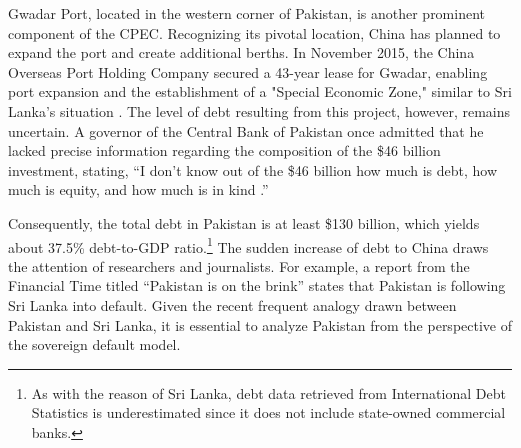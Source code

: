 Gwadar Port, located in the western corner of Pakistan, is another prominent component of the CPEC.
Recognizing its pivotal location, China has planned to expand the port and create additional berths. In November 2015, the China Overseas Port Holding Company secured a 43-year lease for Gwadar, enabling port expansion and the establishment of a "Special Economic Zone," similar to Sri Lanka's situation \citep{Ranade-17-CPEC}.
The level of debt resulting from this project, however, remains uncertain. A governor of the Central Bank of Pakistan once admitted that he lacked precise information regarding the composition of the \$46 billion investment, stating, ``I don't know out of the \$46 billion how much is debt, how much is equity, and how much is in kind \citep{small2020returning}.''

Consequently, the total debt in Pakistan is at least \$130 billion, which yields about 37.5\% debt-to-GDP ratio.\footnote{
    As with the reason of Sri Lanka, debt data retrieved from International Debt Statistics is underestimated since it does not include state-owned commercial banks.
}
The sudden increase of debt to China draws the attention of researchers and journalists. For example, a report from the Financial Time titled ``Pakistan is on the brink'' states that Pakistan is following Sri Lanka into default.
Given the recent frequent analogy drawn between Pakistan and Sri Lanka, it is essential to analyze Pakistan from the perspective of the sovereign default model.
